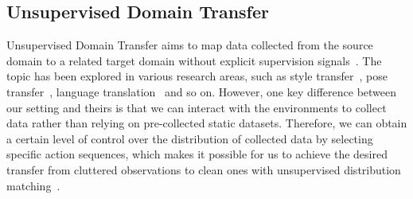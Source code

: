 

\subsection{Unsupervised Domain Transfer}
Unsupervised Domain Transfer aims to map data collected from the source domain to a related target domain without explicit supervision signals~\citep{wang2021survey}. The topic has been explored in various research areas, such as style transfer~\citep{Zhu2017UnpairedIT,Zhao2022EGSDEUI}, pose transfer~\citep{Li2023CrossLocoHM}, language translation~\citep{lachaux2020unsupervised,artetxe2017unsupervised} and so on. However, one key difference between our setting and theirs is that we can interact with the environments to collect data rather than relying on pre-collected static datasets. Therefore, we can obtain a certain level of control over the distribution of collected data by selecting specific action sequences, which makes it possible for us to achieve the desired transfer from cluttered observations to clean ones with unsupervised distribution matching~\citep{cao2018unsupervised,baktashmotlagh2016distribution}.


